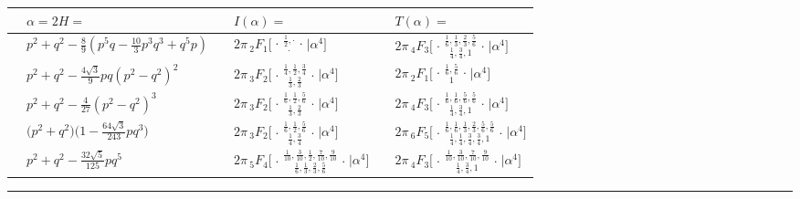 \documentclass[nofootinbib,preprint]{revtex4-1}
\renewcommand{\arraystretch}{1.3}
\begin{document}
\begin{table}[t]
\begin{center}
\label{tab:HypSextics}
{\renewcommand{\arraystretch}{2}%
\begin{tabularx}{\textwidth}{ c l | c l | c l }
\hline \hline
\hspace{0.1cm} & 
$\alpha = 2H =$ & \hspace{0.1cm} 
& $I(\alpha)=$ &\hspace{0.1cm} & $T(\alpha)=$ \\
\hline
& $p^2 + q^2 - \frac{8}{9}( p^5 q -\frac{10}{3}p^3q^3 +q^5 p)$ \hspace{0.5cm} & &
$2\pi\,_2F_1 \Big[ \genfrac..{0pt}{}{
\frac{1}{2},\cdot
}{\cdot}\Big| \alpha^4 \Big]$   & &
$2\pi\,_4F_3 \Big[ \genfrac..{0pt}{}{
\frac{1}{6},\frac{1}{3},\frac{2}{3},\frac{5}{6}
}{\frac{1}{4},\frac{3}{4},1}\Big| \alpha^4 \Big]$     \\
& $p^2 + q^2 - \frac{4 \sqrt{3}}{9} p q (p^2 - q^2)^2$  & &
$2\pi\,_3F_2 \Big[ \genfrac..{0pt}{}{
\frac{1}{4},\frac{1}{2},\frac{3}{4}
}{\frac{1}{3},\frac{2}{3}}\Big| \alpha^4 \Big]$   & &
$2\pi\,_2F_1 \Big[ \genfrac..{0pt}{}{
\frac{1}{6},\frac{5}{6}
}{1}\Big| \alpha^4 \Big]$     \\
& $p^2 + q^2 - \frac{4}{27}(p^2-q^2)^3$  & &
$2\pi\,_3F_2 \Big[ \genfrac..{0pt}{}{
\frac{1}{6},\frac{1}{2},\frac{5}{6}
}{\frac{1}{3},\frac{2}{3}}\Big| \alpha^4 \Big]$   & &
$2\pi\,_4F_3 \Big[ \genfrac..{0pt}{}{
\frac{1}{6},\frac{1}{6},\frac{5}{6},\frac{5}{6}
}{\frac{1}{4},\frac{3}{4},1}\Big| \alpha^4 \Big]$     \\
& $\big(p^2 + q^2\big)\big(1 - \frac{64\sqrt{3}}{243} p q^3\big)$  & &
$2\pi\,_3F_2 \Big[ \genfrac..{0pt}{}{
\frac{1}{6},\frac{1}{2},\frac{5}{6}
}{\frac{1}{4},\frac{3}{4}}\Big| \alpha^4 \Big]$   & &
$2\pi\,_6F_5 \Big[ \genfrac..{0pt}{}{
\frac{1}{6},\frac{1}{6},\frac{1}{3},\frac{2}{3},\frac{5}{6},\frac{5}{6}
}{\frac{1}{4},\frac{1}{4},\frac{3}{4},\frac{3}{4},1}\Big| \alpha^4 \Big]$     \\
& $p^2 + q^2 - \frac{32\sqrt{5}}{125} p q^5$  & &
$2\pi\,_5F_4 \Big[ \genfrac..{0pt}{}{
\frac{1}{10},\frac{3}{10},\frac{1}{2},\frac{7}{10},\frac{9}{10}
}{\frac{1}{6},\frac{1}{3},\frac{2}{3},\frac{5}{6}}\Big| \alpha^4 \Big]$ \hspace{0.5cm}  & &
$2\pi\,_4F_3 \Big[ \genfrac..{0pt}{}{
\frac{1}{10},\frac{3}{10},\frac{7}{10},\frac{9}{10}
}{\frac{1}{4},\frac{3}{4},1}\Big| \alpha^4 \Big]$     \\
\end{tabularx}}
\rule{\textwidth}{.01cm}
\end{center}
\end{table}
\end{document}
